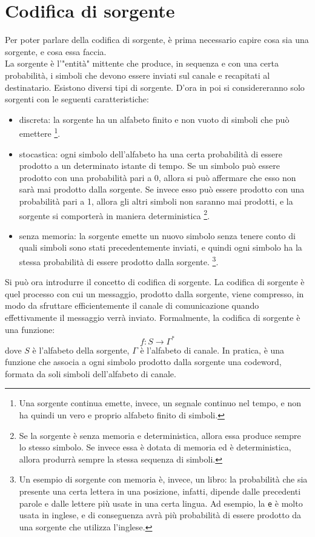 \chapter{Codifica di sorgente}
Per poter parlare della codifica di sorgente, è prima necessario capire
cosa sia una sorgente, e cosa essa faccia.\\
La sorgente è l'"entità" mittente che produce, in sequenza e con una certa probabilità,
i simboli che devono essere inviati sul canale e recapitati al destinatario.
Esistono diversi tipi di sorgente. D'ora in poi si considereranno solo sorgenti
con le seguenti caratteristiche:
\begin{itemize}
    \item discreta: la sorgente ha un alfabeto finito e non vuoto di simboli
    che può emettere \footnote{Una sorgente continua emette, invece, un segnale
    continuo nel tempo, e non ha quindi un vero e proprio alfabeto finito
    di simboli.}.
    \item stocastica: ogni simbolo dell'alfabeto ha una certa probabilità
    di essere prodotto a un determinato istante di tempo.
    Se un simbolo può essere prodotto con una probabilità pari a 0,
    allora si può affermare che esso non sarà mai prodotto dalla sorgente.
    Se invece esso può essere prodotto con una probabilità pari a 1,
    allora gli altri simboli non saranno mai prodotti, e la sorgente si
    comporterà in maniera deterministica \footnote{Se la sorgente
    è senza memoria e deterministica, allora essa produce sempre lo stesso
    simbolo. Se invece essa è dotata di memoria ed è deterministica,
    allora produrrà sempre la stessa sequenza di simboli.}.
    \item senza memoria: la sorgente emette un nuovo simbolo senza tenere
    conto di quali simboli sono stati precedentemente inviati, e quindi
    ogni simbolo ha la stessa probabilità di essere prodotto dalla sorgente.
    \footnote{Un esempio di sorgente con memoria è, invece, un libro: la probabilità
    che sia presente una certa lettera in una posizione, infatti, dipende
    dalle precedenti parole e dalle lettere più usate in una certa lingua. Ad
    esempio, la \verb|e| è molto usata in inglese, e di conseguenza avrà
    più probabilità di essere prodotto da una sorgente che utilizza l'inglese.}.
\end{itemize}

Si può ora introdurre il concetto di codifica di sorgente.
La codifica di sorgente è quel processo con cui un messaggio, prodotto
dalla sorgente, viene compresso, in modo da sfruttare efficientemente il canale
di comunicazione quando effettivamente il messaggio verrà inviato.
Formalmente, la codifica di sorgente è una funzione:
\[
    f: S \rightarrow \Gamma^*
\]
dove $S$ è l'alfabeto della sorgente, $\Gamma$ è l'alfabeto di canale.
In pratica, è una funzione che associa a ogni simbolo prodotto dalla sorgente
una codeword, formata da soli simboli dell'alfabeto di canale.

